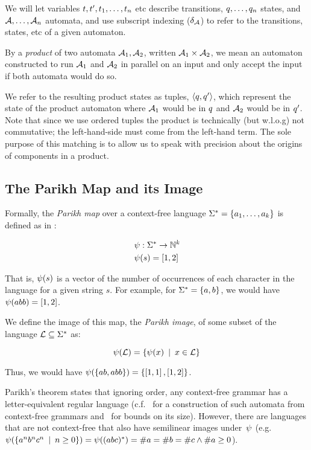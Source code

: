 \documentclass[acmsmall,review,anonymous]{acmart}\settopmatter{printfolios=true,printccs=false,printacmref=true}
\theoremstyle{definition}
\begin{document}
We will let variables $\Transition, \Transition', \Transition_1, \ldots, \Transition_n$ etc describe transitions, $\State, \ldots, \State_n$ states, and $\Automaton, \ldots, \Automaton_n$ automata, and use subscript indexing ($\Transitions_\Automaton$) to refer to the transitions, states, etc of a given automaton.

By a \emph{product} of two automata $\Automaton_1, \Automaton_2$, written
$\Automaton_1 \times \Automaton_2$, we mean an automaton constructed to run
$\Automaton_1$ and $\Automaton_2$ in parallel on an input and only accept the
input if both automata would do so.

We refer to the resulting product states as tuples, $\Tuple{\State, \State'}$,
which represent the state of the product automaton where $\Automaton_1$ would be
in $\State$ and $\Automaton_2$ would be in $\State'$. Note that since we use
ordered tuples the product is technically (but w.l.o.g) not commutative; the
left-hand-side must come from the left-hand term. The sole purpose of this
matching is to allow us to speak with precision about the origins of components
in a product.

\subsection{The Parikh Map and its Image}
Formally, the \textit{Parikh map} over a context-free language $\Strings=
\left\{a_1, \ldots, a_k \right\}$ is defined as in \cite{kozen}:

$$
\begin{aligned}
& \ParikhMap: \MapFromTo{\Strings}{\natural^k} \\
& \ParikhMap(s) = \VectorLiteral{\#a_1(s), \#a_2(s), \ldots, \#a_k(s)}
\end{aligned}
$$

That is, $\ParikhMap(s)$ is a vector of the number of occurrences of each
character in the language for a given string $s$. For example, for  $\Strings =
\Set{a, b}$, we would have $\ParikhMap(abb) = \VectorLiteral{1, 2}$.

We define the image of this map, the \textit{Parikh image}, of some subset of
the language $\Language \subseteq \Strings$ as:

\[
\ParikhMap(\Language) = \Set{\ParikhMap(x) \SuchThat x \in \Language}
\]

Thus, we would have $\ParikhMap(\left\{ab, abb\right\}) = \left\{\left[1,
1\right], \left[1, 2\right]\right\}$.

Parikh's theorem states that ignoring order, any context-free grammar has a
letter-equivalent regular language (c.f.~\cite{construction} for a construction of
such automata from context-free grammars and~\cite{bounds} for bounds on its size). However, there are languages that are
not context-free that also have semilinear images under~$\ParikhMap$ (e.g.
$\ParikhMap(\Set{a^nb^nc^n \SuchThat n \geq 0}) = \ParikhMap((abc)^*) = \#a =
\#b = \#c \land \#a \geq 0$).
\end{document}
